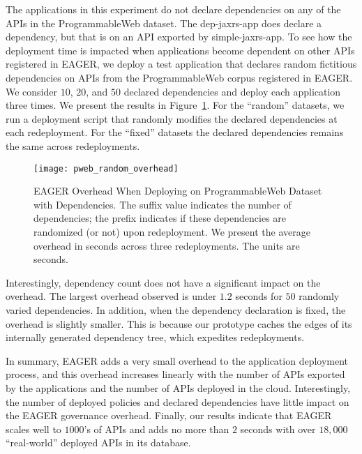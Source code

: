 The applications in this experiment do not declare dependencies on any of the APIs 
in the ProgrammableWeb dataset. The dep-jaxrs-app does declare a dependency, 
but that is on an API exported by 
simple-jaxrs-app. To see how the deployment time is impacted
when applications become dependent on other APIs registered in EAGER, we
deploy a test application that declares random fictitious dependencies on APIs
from the ProgrammableWeb corpus registered in EAGER.  We consider 
$10$, $20$, and $50$ declared dependencies and deploy each
application three times.
We present the results in Figure~\ref{fig:pweb_random_overhead}.
For the ``random'' datasets, we
run a deployment script that randomly modifies the 
declared dependencies at each redeployment. For the 
``fixed'' datasets the declared dependencies remains the same across
redeployments.

\begin{figure}
\centering
\texttt{[image: pweb\_random\_overhead]}
\caption{EAGER Overhead When Deploying on ProgrammableWeb Dataset with
Dependencies. The suffix value indicates the number of dependencies;
the prefix indicates if these dependencies are randomized (or not) upon
redeployment.  We present the average overhead in seconds across three
redeployments.  The units are seconds.
\label{fig:pweb_random_overhead}
}
\end{figure}


Interestingly, dependency count does not have a significant impact on 
the overhead.  The largest overhead observed is under $1.2$ seconds
for $50$ randomly varied dependencies.
In addition, when the dependency declaration is fixed, the overhead is slightly smaller. 
This is because our prototype caches the edges of its internally generated dependency tree, 
which expedites redeployments.

In summary, EAGER adds a very small overhead to the application deployment
process, and 
this overhead increases linearly with the number of APIs exported by the applications
and the number of APIs deployed in the cloud. 
Interestingly, the number of deployed policies and declared dependencies
have little impact on the EAGER governance overhead. 
Finally, our results indicate that EAGER scales 
well to $1000$'s of APIs and adds no more than $2$ seconds with over
$18,000$ ``real-world'' deployed APIs in its database.
